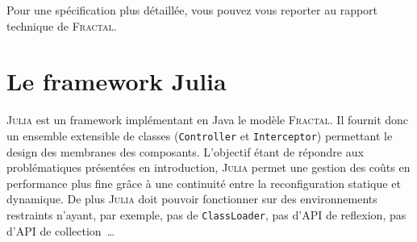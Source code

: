 \documentclass[12pt,a4paper,utf8x]{report}
\newcommand{\versalitas}[1]{{\usefont{T1}{cmr}{bx}{sc}#1}}%
\newcommand\fractal{\textsc{Fractal}}
\newcommand\julia{\textsc{Julia}}
\begin{document}
Pour une spécification plus détaillée, vous pouvez vous reporter au rapport technique de \fractal\cite{TFCM}.






\section{Le framework \versalitas{Julia}}
\julia\cite{Julia} est un framework implémentant en Java le modèle \fractal. Il fournit donc un ensemble extensible de classes (\verb+Controller+ et \verb+Interceptor+) permettant le design des membranes des composants. L'objectif étant de répondre aux problématiques présentées en introduction, \julia{} permet une gestion des coûts en performance plus fine grâce à une continuité entre la reconfiguration statique et dynamique. De plus \julia{} doit pouvoir fonctionner sur des environnements restraints n'ayant, par exemple, pas de \verb+ClassLoader+, pas d'\textsc{API} de reflexion, pas d'\textsc{API} de collection~\dots{}
\end{document}
